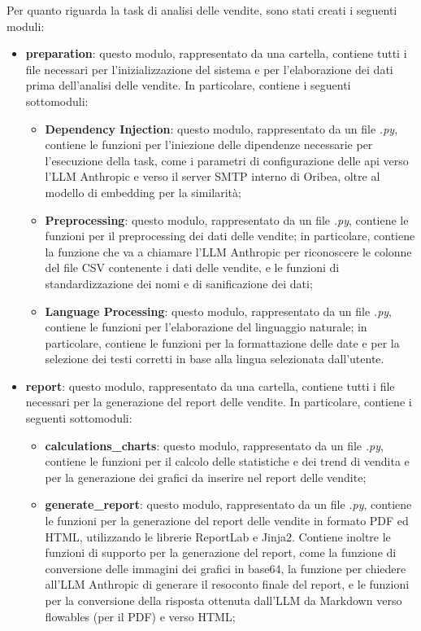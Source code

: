 Per quanto riguarda la task di analisi delle vendite, sono stati creati i seguenti moduli:
\begin{itemize}
    \item \textbf{preparation}: questo modulo, rappresentato da una cartella, contiene tutti i file necessari per l'inizializzazione del sistema e per l'elaborazione dei dati prima dell'analisi delle vendite. In particolare, contiene i seguenti sottomoduli:
    \begin{itemize}
        \item \textbf{Dependency Injection}: questo modulo, rappresentato da un file \emph{.py}, contiene le funzioni per l'iniezione delle dipendenze necessarie per l'esecuzione della task, come i parametri di configurazione delle \gls{api} verso l'LLM Anthropic e verso il server SMTP interno di Oribea, oltre al modello di embedding per la similarità;
        \item \textbf{Preprocessing}: questo modulo, rappresentato da un file \emph{.py}, contiene le funzioni per il preprocessing dei dati delle vendite; in particolare, contiene la funzione che va a chiamare l'LLM Anthropic per riconoscere le colonne del file CSV contenente i dati delle vendite, e le funzioni di standardizzazione dei nomi e di sanificazione dei dati;
        \item \textbf{Language Processing}: questo modulo, rappresentato da un file \emph{.py}, contiene le funzioni per l'elaborazione del linguaggio naturale; in particolare, contiene le funzioni per la formattazione delle date e per la selezione dei testi corretti in base alla lingua selezionata dall'utente.
    \end{itemize}
    \item \textbf{report}: questo modulo, rappresentato da una cartella, contiene tutti i file necessari per la generazione del report delle vendite. In particolare, contiene i seguenti sottomoduli:
    \begin{itemize}
        \item \textbf{calculations\_charts}: questo modulo, rappresentato da un file \emph{.py}, contiene le funzioni per il calcolo delle statistiche e dei trend di vendita e per la generazione dei grafici da inserire nel report delle vendite;
        \item \textbf{generate\_report}: questo modulo, rappresentato da un file \emph{.py}, contiene le funzioni per la generazione del report delle vendite in formato PDF ed HTML, utilizzando le librerie ReportLab e Jinja2. Contiene inoltre le funzioni di supporto per la generazione del report, come la funzione di conversione delle immagini dei grafici in base64, la funzione per chiedere all'LLM Anthropic di generare il resoconto finale del report, e le funzioni per la conversione della risposta ottenuta dall'LLM da Markdown verso flowables (per il PDF) e verso HTML;

\end{itemize}
\end{itemize}
